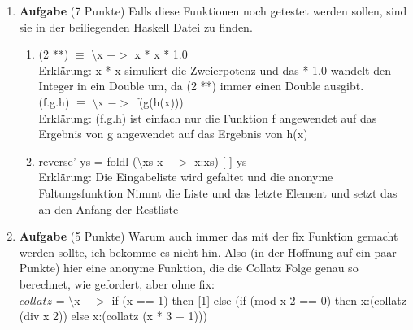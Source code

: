 \documentclass[11pt]{article}
\newcommand{\punkte}[1]{{\small{ }(#1 Punkte)}}
\newcommand{\aufgabe}[1]{\item{\bf #1}}
\begin{document}
\begin{enumerate}
\aufgabe{Aufgabe}\punkte{7}
Falls diese Funktionen noch getestet werden sollen, sind sie in der beiliegenden Haskell Datei zu finden.
\begin{enumerate}
\item (2 **) $\equiv$ $\setminus$x $->$ x * x * 1.0\\
Erklärung: x * x simuliert die Zweierpotenz und das * 1.0 wandelt den Integer in ein Double um, da (2 **) immer einen Double ausgibt.\\
\newline
(f.g.h) $\equiv$ $\setminus$x $->$ f(g(h(x)))\\
Erklärung: (f.g.h) ist einfach nur die Funktion f angewendet auf das Ergebnis von g angewendet auf das Ergebnis von h(x)

\item reverse' ys = foldl ($\setminus$xs x $->$ x:xs) [ ] ys\\
Erklärung: Die Eingabeliste wird gefaltet und die anonyme Faltungsfunktion Nimmt die Liste und das letzte Element und setzt das an den Anfang der Restliste 
\end{enumerate}
\newpage
\aufgabe{Aufgabe}\punkte{5}
Warum auch immer das mit der fix Funktion gemacht werden sollte, ich bekomme es nicht hin. Also (in der Hoffnung auf ein paar Punkte) hier eine anonyme Funktion, die die Collatz Folge genau so berechnet, wie gefordert, aber ohne fix:\\
$collatz$ = $\setminus$x $->$ if (x == 1) then [1] else (if (mod x 2 == 0) then x:(collatz (div x 2)) else x:(collatz (x * 3 + 1)))
\end{enumerate}
\end{document}
